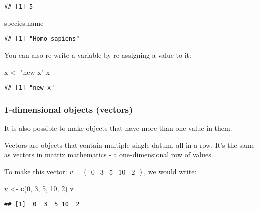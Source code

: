 \documentclass[]{article}
\newenvironment{Shaded}{\begin{snugshade}}{\end{snugshade}}
\newcommand{\KeywordTok}[1]{\textcolor[rgb]{0.13,0.29,0.53}{\textbf{#1}}}
\newcommand{\DecValTok}[1]{\textcolor[rgb]{0.00,0.00,0.81}{#1}}
\newcommand{\StringTok}[1]{\textcolor[rgb]{0.31,0.60,0.02}{#1}}
\newcommand{\NormalTok}[1]{#1}
\begin{document}
\begin{verbatim}
## [1] 5
\end{verbatim}

\begin{Shaded}
\begin{Highlighting}[]
\NormalTok{species.name}
\end{Highlighting}
\end{Shaded}

\begin{verbatim}
## [1] "Homo sapiens"
\end{verbatim}

You can also re-write a variable by re-assigning a value to it:

\begin{Shaded}
\begin{Highlighting}[]
\NormalTok{x <-}\StringTok{ "new x"}
\NormalTok{x}
\end{Highlighting}
\end{Shaded}

\begin{verbatim}
## [1] "new x"
\end{verbatim}

\subsubsection{1-dimensional objects
(vectors)}\label{dimensional-objects-vectors}

It is also possible to make objects that have more than one value in
them.

Vectors are objects that contain multiple single datum, all in a row.
It's the same as vectors in matrix mathematics - a one-dimensional row
of values.

To make this vector:
\(v = \begin{pmatrix} 0 & 3 & 5 & 10 & 2 \end{pmatrix}\), we would
write:

\begin{Shaded}
\begin{Highlighting}[]
\NormalTok{v <-}\StringTok{ }\KeywordTok{c}\NormalTok{(}\DecValTok{0}\NormalTok{, }\DecValTok{3}\NormalTok{, }\DecValTok{5}\NormalTok{, }\DecValTok{10}\NormalTok{, }\DecValTok{2}\NormalTok{)}
\NormalTok{v}
\end{Highlighting}
\end{Shaded}

\begin{verbatim}
## [1]  0  3  5 10  2
\end{verbatim}
\end{document}
